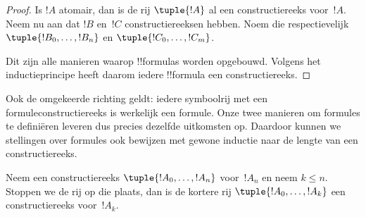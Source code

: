 \documentclass[../../../include/open-logic-section]{subfiles}
\begin{document}
\begin{proof}
Is $!A$ atomair, dan is de rij $\tuple{!A}$ al een
constructiereeks voor~$!A$.
%
Neem nu aan dat $!B$ en~$!C$ constructiereeksen hebben. Noem die
respectievelijk $\tuple{!B_0,\dotsc,!B_n}$ en
$\tuple{!C_0,\dotsc,!C_m}$.
%
\begin{enumerate}
\end{enumerate}
Dit zijn alle manieren waarop !!{formula}s worden opgebouwd. Volgens
het inductieprincipe heeft daarom iedere !!{formula} een
constructiereeks.
\end{proof}

Ook de omgekeerde richting geldt: iedere symboolrij met een
formuleconstructiereeks is werkelijk een formule. Onze twee manieren
om formules te definiëren leveren dus precies dezelfde uitkomsten op.
Daardoor kunnen we stellingen over formules ook bewijzen met gewone
inductie naar de lengte van een constructiereeks.

\begin{lem}
Neem een constructiereeks $\tuple{!A_0,\dotsc,!A_n}$ voor~$!A_n$ en
neem $k \leq n$. Stoppen we de rij op die plaats, dan is de kortere rij
$\tuple{!A_0,\dotsc,!A_k}$ een constructiereeks voor~$!A_k$.
\end{lem}
\end{document}
